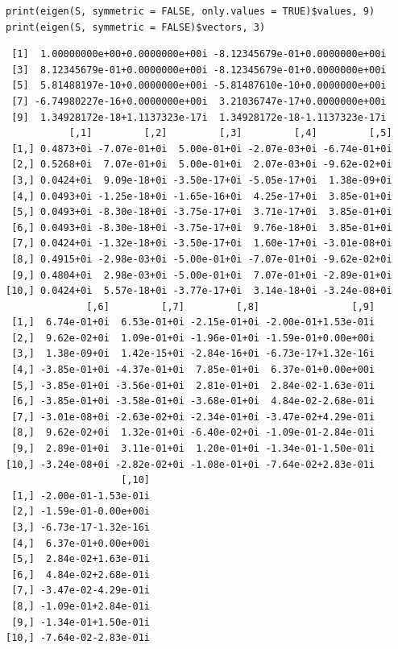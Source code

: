 \documentclass[11pt]{article}
\begin{document}
\begin{lstlisting}
print(eigen(S, symmetric = FALSE, only.values = TRUE)$values, 9)
print(eigen(S, symmetric = FALSE)$vectors, 3)
\end{lstlisting}

\begin{verbatim}
 [1]  1.00000000e+00+0.0000000e+00i -8.12345679e-01+0.0000000e+00i
 [3]  8.12345679e-01+0.0000000e+00i -8.12345679e-01+0.0000000e+00i
 [5]  5.81488197e-10+0.0000000e+00i -5.81487610e-10+0.0000000e+00i
 [7] -6.74980227e-16+0.0000000e+00i  3.21036747e-17+0.0000000e+00i
 [9]  1.34928172e-18+1.1137323e-17i  1.34928172e-18-1.1137323e-17i
           [,1]         [,2]         [,3]         [,4]         [,5]
 [1,] 0.4873+0i -7.07e-01+0i  5.00e-01+0i -2.07e-03+0i -6.74e-01+0i
 [2,] 0.5268+0i  7.07e-01+0i  5.00e-01+0i  2.07e-03+0i -9.62e-02+0i
 [3,] 0.0424+0i  9.09e-18+0i -3.50e-17+0i -5.05e-17+0i  1.38e-09+0i
 [4,] 0.0493+0i -1.25e-18+0i -1.65e-16+0i  4.25e-17+0i  3.85e-01+0i
 [5,] 0.0493+0i -8.30e-18+0i -3.75e-17+0i  3.71e-17+0i  3.85e-01+0i
 [6,] 0.0493+0i -8.30e-18+0i -3.75e-17+0i  9.76e-18+0i  3.85e-01+0i
 [7,] 0.0424+0i -1.32e-18+0i -3.50e-17+0i  1.60e-17+0i -3.01e-08+0i
 [8,] 0.4915+0i -2.98e-03+0i -5.00e-01+0i -7.07e-01+0i -9.62e-02+0i
 [9,] 0.4804+0i  2.98e-03+0i -5.00e-01+0i  7.07e-01+0i -2.89e-01+0i
[10,] 0.0424+0i  5.57e-18+0i -3.77e-17+0i  3.14e-18+0i -3.24e-08+0i
              [,6]         [,7]         [,8]                [,9]
 [1,]  6.74e-01+0i  6.53e-01+0i -2.15e-01+0i -2.00e-01+1.53e-01i
 [2,]  9.62e-02+0i  1.09e-01+0i -1.96e-01+0i -1.59e-01+0.00e+00i
 [3,]  1.38e-09+0i  1.42e-15+0i -2.84e-16+0i -6.73e-17+1.32e-16i
 [4,] -3.85e-01+0i -4.37e-01+0i  7.85e-01+0i  6.37e-01+0.00e+00i
 [5,] -3.85e-01+0i -3.56e-01+0i  2.81e-01+0i  2.84e-02-1.63e-01i
 [6,] -3.85e-01+0i -3.58e-01+0i -3.68e-01+0i  4.84e-02-2.68e-01i
 [7,] -3.01e-08+0i -2.63e-02+0i -2.34e-01+0i -3.47e-02+4.29e-01i
 [8,]  9.62e-02+0i  1.32e-01+0i -6.40e-02+0i -1.09e-01-2.84e-01i
 [9,]  2.89e-01+0i  3.11e-01+0i  1.20e-01+0i -1.34e-01-1.50e-01i
[10,] -3.24e-08+0i -2.82e-02+0i -1.08e-01+0i -7.64e-02+2.83e-01i
                    [,10]
 [1,] -2.00e-01-1.53e-01i
 [2,] -1.59e-01-0.00e+00i
 [3,] -6.73e-17-1.32e-16i
 [4,]  6.37e-01+0.00e+00i
 [5,]  2.84e-02+1.63e-01i
 [6,]  4.84e-02+2.68e-01i
 [7,] -3.47e-02-4.29e-01i
 [8,] -1.09e-01+2.84e-01i
 [9,] -1.34e-01+1.50e-01i
[10,] -7.64e-02-2.83e-01i
\end{verbatim}
\end{document}
